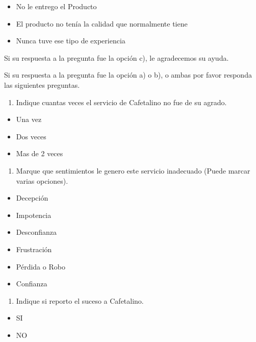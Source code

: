 \begin{itemize}[label=$\square$,itemsep=1pt,leftmargin=3em]
\item No le entrego el Producto
\item El producto no tenía la calidad que normalmente tiene
\item Nunca tuve ese tipo de experiencia
\end{itemize}

Si su respuesta a la pregunta fue la opción c), le agradecemos su ayuda.

Si su respuesta a la pregunta fue la opción a) o b), o ambas por favor responda las siguientes preguntas.

\begin{enumerate}
\def\labelenumi{\arabic{enumi}.}
\setcounter{enumi}{3}
\item
  Indique cuantas veces el servicio de Cafetalino no fue de su agrado.
\end{enumerate}

\begin{itemize}[label=$\square$,itemsep=1pt,leftmargin=3em]
\item Una vez
\item Dos veces
\item Mas de 2 veces
\end{itemize}

\begin{enumerate}
\def\labelenumi{\arabic{enumi}.}
\setcounter{enumi}{4}
\item
  Marque que sentimientos le genero este servicio inadecuado (Puede marcar varias opciones).
\end{enumerate}

\begin{itemize}[label=$\square$,itemsep=1pt,leftmargin=3em]
\item Decepción
\item Impotencia
\item Desconfianza
\item Frustración
\item Pérdida o Robo
\item Confianza
\end{itemize}

\begin{enumerate}
\def\labelenumi{\arabic{enumi}.}
\setcounter{enumi}{5}
\item
  Indique si reporto el suceso a Cafetalino.
\end{enumerate}

\begin{itemize}[label=$\square$,itemsep=1pt,leftmargin=3em]
\item SI
\item NO
\end{itemize}

